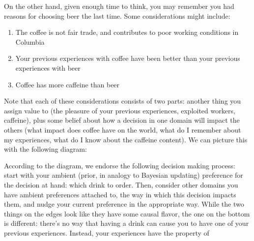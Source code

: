 \documentclass{article}
\begin{document}
	
	On the other hand, given enough time to think, you may remember you had reasons for choosing beer the last time. Some considerations might include:
	\begin{enumerate}[nosep]
		\item The coffee is not fair trade, and contributes to poor working conditions in Columbia
		\item Your previous experiences with coffee have been better than your previous experiences with beer
		\item Coffee has more caffeine than beer	
	\end{enumerate}
	
	Note that each of these considerations consists of two parts: another thing you assign value to (the pleasure of your previous experiences, exploited workers, caffeine), plus some belief about how a decision in one domain will impact the others (what impact does coffee have on the world, what do I remember about my experiences, what do I know about the caffeine content). We can picture this with the following diagram:
	
	\begin{center}
	\end{center}
	According to the diagram, we endorse the following decision making process: start with your ambient (prior, in analogy to Bayesian updating) preference for the decision at hand: which drink to order. Then, consider other domains you have ambient preferences attached to, the way in which this decision impacts them, and nudge your current preference in the appropriate way. While the two things on the edges look like they have some causal flavor, the one on the bottom is different: there's no way that having a drink can cause you to have one of your previous experiences. Instead, your experiences have the property of \todo{}
	
\end{document}
